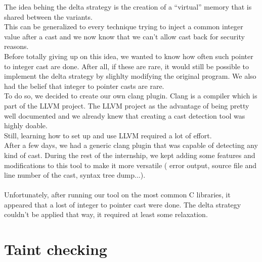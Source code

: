 \documentclass[english]{enstaPRE}
\begin{document}
The idea behing the delta strategy is the creation of a ``virtual'' memory that is shared between the variants. \\
This can be generalized to every technique trying to inject a common integer value after a cast and we now know that we can't allow
cast back for security reasons. \\ Before totally giving up on this idea, we wanted to know how often such pointer to integer cast are
done. After all, if these are rare, it would still be possible to implement the delta strategy by slighlty modifying the original 
program. We also had the belief that integer to pointer casts are rare.\\ 
To do so, we decided to create our own clang plugin. Clang is a compiler which is part of the LLVM project. The LLVM project as 
the advantage of being pretty well documented and we already knew that creating a cast detection tool was highly doable. \\
Still, learning how to set up and use LLVM required a lot of effort. \\
After a few days, we had a generic clang plugin that was capable of detecting any kind of cast. During the rest of the internship,
we kept adding some features and modifications to this tool to make it more versatile ( error output, source file and line number of 
the cast, syntax tree dump...). \\ \\
Unfortunately, after running our tool on the most common C libraries, it appeared that a lost of integer to pointer cast were done.
The delta strategy couldn't be applied that way, it required at least some relaxation.

\section{Taint checking}
\end{document}
